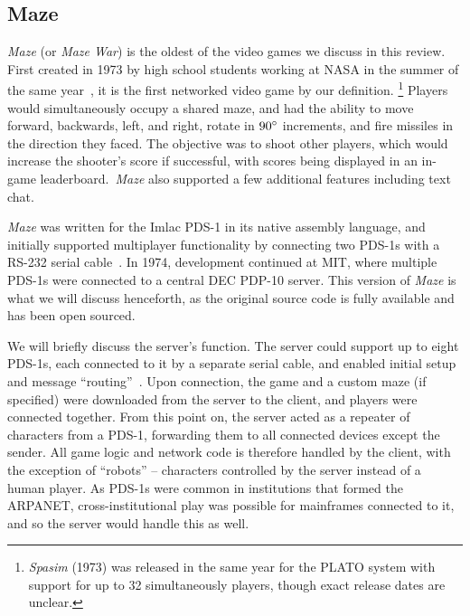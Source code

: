 \subsection{Maze}\label{subsec:maze}

\textit{Maze} (or \textit{Maze War}) is the oldest of the video games we discuss in this review. First created in 1973 by high school students working at NASA in the summer of the same year~\cite{thompson}, it is the first networked video game by our definition.
\footnote{\textit{Spasim} (1973) was released in the same year for the PLATO system with support for up to 32 simultaneously players, though exact release dates are unclear.}
Players would simultaneously occupy a shared maze, and had the ability to move forward, backwards, left, and right, rotate in $90\degree$ increments, and fire missiles in the direction they faced. The objective was to shoot other players, which would increase the shooter's score if successful, with scores being displayed in an in-game leaderboard.\ \textit{Maze} also supported a few additional features including text chat.

\textit{Maze} was written for the Imlac PDS-1 in its native assembly language, and initially supported multiplayer functionality by connecting two PDS-1s with a RS-232 serial cable~\cite{thompson}. In 1974, development continued at MIT, where multiple PDS-1s were connected to a central DEC PDP-10 server. This version of \textit{Maze} is what we will discuss henceforth, as the original source code is fully available and has been open sourced.

%

We will briefly discuss the server's function. The server could support up to eight PDS-1s, each connected to it by a separate serial cable, and enabled initial setup and message ``routing''~\cite{thompson}. Upon connection, the game and a custom maze (if specified) were downloaded from the server to the client, and players were connected together. From this point on, the server acted as a repeater of characters from a PDS-1, forwarding them to all connected devices except the sender. All game logic and network code is therefore handled by the client, with the exception of ``robots'' -- characters controlled by the server instead of a human player.
As PDS-1s were common in institutions that formed the ARPANET, cross-institutional play was possible for mainframes connected to it, and so the server would handle this as well.

%

